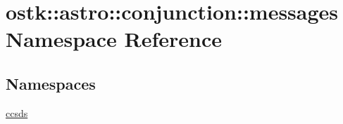 \hypertarget{namespaceostk_1_1astro_1_1conjunction_1_1messages}{}\section{ostk\+:\+:astro\+:\+:conjunction\+:\+:messages Namespace Reference}
\label{namespaceostk_1_1astro_1_1conjunction_1_1messages}
\subsection*{Namespaces}
\begin{DoxyCompactItemize}
\item 
 \hyperlink{namespaceostk_1_1astro_1_1conjunction_1_1messages_1_1ccsds}{ccsds}
\end{DoxyCompactItemize}
